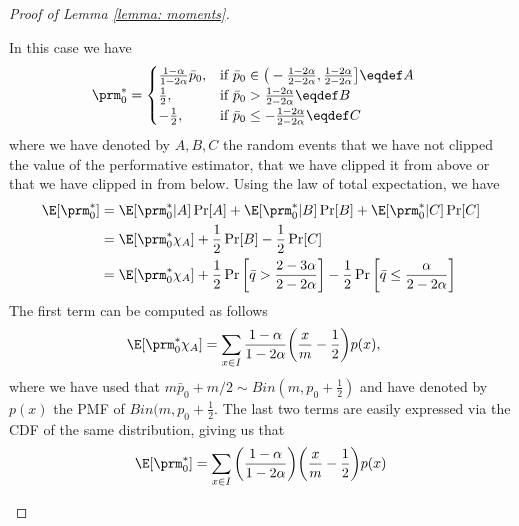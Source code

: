 \begin{proof}[Proof of Lemma \ref{lemma: moments}]
\begin{enumerate}[(i)]
            In this case we have 
            \begin{align*}
                \prm^\ast_0 &= 
                \begin{cases}
                    \frac{1 - \alpha}{1-2\alpha} \bar{p}_0, & \text{if }
                    \bar{p}_0 \in \big(- \frac{1-2\alpha}{2 - 2\alpha},
                    \frac{1-2\alpha}{2 - 2\alpha} \big] \eqdef A\\
                    \frac12 , & \text{if } \bar{p}_0 > \frac{1-2\alpha}{2
                    - 2\alpha} \eqdef B\\
                    -\frac12 , & \text{if } \bar{p}_0 \le -
                    \frac{1-2\alpha}{2 - 2\alpha} \eqdef C
                \end{cases}
            \end{align*}
            where we have denoted by $A,B,C$ the random events that we have not
            clipped the value of the performative estimator, that we have
            clipped it from above or that we have clipped in from below. Using
            the law of total expectation, we have
            \begin{align*}
                \E[\prm^\ast_0] &= \E[\prm^\ast_0 | A] \Pr[A] + \E[\prm^\ast_0
                | B] \Pr[B] + \E[\prm^\ast_0 | C] \Pr[C]\\
                &= \E[\prm^\ast_0 \chi_{A}] + \frac12 \Pr[B] - \frac12 \Pr[C]\\
                &= \E[\prm^\ast_0 \chi_{A}] + \frac12 \Pr\bigg[\bar{q} >
                \frac{2-3\alpha}{2-2\alpha}\bigg] - \frac12
                \Pr\bigg[\bar{q} \le \frac{\alpha}{2-2\alpha}\bigg]
            \end{align*}
            The first term can be computed as follows
            \begin{align*}
                \E[\prm^\ast_0 \chi_{A}] &= \sum_{x \in I} \frac{1 -
                \alpha}{1-2\alpha} \bigg( \frac{x}{m} - \frac12 \bigg) p(x),
            \end{align*}
            where we have used that $m\bar{p}_0 + m/2 \sim Bin(m, p_0 +
            \frac12)$ and have denoted by $p(x)$ the PMF of $Bin(m, p_0 +
            \frac12$. The last two terms are easily expressed via the CDF of
            the same distribution, giving us that
            \begin{align*}
                \E[\prm^\ast_0] = \sum_{x \in I} \bigg(\frac{1 -
                \alpha}{1-2\alpha}\bigg) \bigg(\frac{x}{m} - \frac12 \bigg)
                p(x)

\end{align*}
\end{enumerate}
\end{proof}
